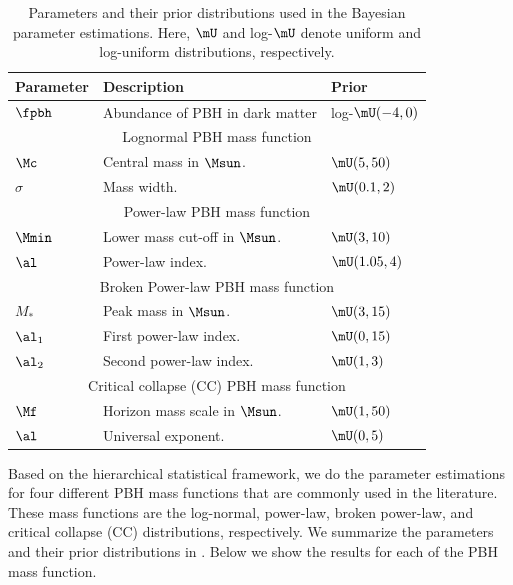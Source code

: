 \documentclass[twocolumn]{aastex631}
\def\[{\left[}
\begin{document}
\begin{table}[tbp!]
	\centering
	\begin{tabular}{lll}
		\hline\hline
		\textbf{Parameter\quad} & \textbf{Description} & \textbf{Prior} \\
		\hline
		$\fpbh$ & Abundance of PBH in dark matter & log-$\mU(-4, 0)$\\
		\hline
		\multicolumn{3}{c}{Lognormal PBH mass function} \\[1pt]
		$\Mc$ & Central mass in $\Msun$. & $\mU(5, 50)$\\
		$\sigma$ & Mass width. & $\mU(0.1, 2)$\\
		\hline
		\multicolumn{3}{c}{Power-law PBH mass function} \\[1pt]
		$\Mmin$ & Lower mass cut-off in $\Msun$. & $\mU(3, 10)$\\
		$\al$ & Power-law index. & $\mU(1.05, 4)$\\
		\hline
		\multicolumn{3}{c}{Broken Power-law PBH mass function} \\[1pt]
		$M_*$ & Peak mass in $\Msun$. & $\mU(3, 15)$\\
		$\al_1$ & First power-law index. & $\mU(0, 15)$\\
		$\al_2$ & Second power-law index. & $\mU(1, 3)$\\
		\hline
		\multicolumn{3}{c}{Critical collapse (CC) PBH mass function} \\[1pt]
		$\Mf$ & Horizon mass scale in $\Msun$. & $\mU(1, 50)$\\
		$\al$ & Universal exponent. & $\mU(0, 5)$\\
		\hline
	\end{tabular}	
	\caption{\label{table:priors}Parameters and their prior distributions used in the Bayesian parameter estimations. Here, $\mU$ and log-$\mU$ denote uniform and log-uniform distributions, respectively.}
\end{table}
Based on the hierarchical statistical framework, we do the parameter estimations for four different PBH mass functions that are commonly used in the literature. These mass functions are the log-normal, power-law, broken power-law, and critical collapse (CC) distributions, respectively. We summarize the parameters and their prior distributions in . Below we show the results for each of the PBH mass function.
\end{document}

